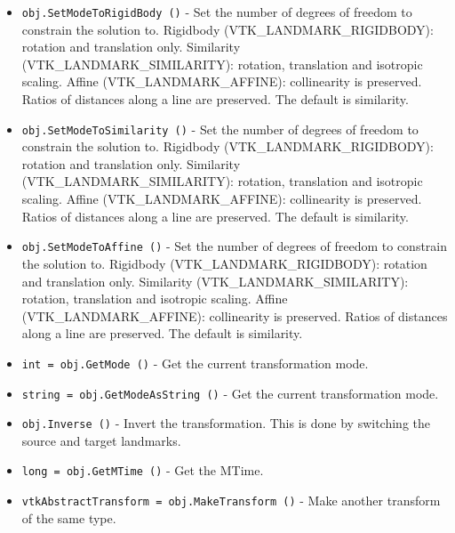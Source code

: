 \begin{itemize}
\item  \verb|obj.SetModeToRigidBody ()| -  Set the number of degrees of freedom to constrain the solution to.
 Rigidbody (VTK\_LANDMARK\_RIGIDBODY): rotation and translation only.  
 Similarity (VTK\_LANDMARK\_SIMILARITY): rotation, translation and 
            isotropic scaling.
 Affine (VTK\_LANDMARK\_AFFINE): collinearity is preserved. 
        Ratios of distances along a line are preserved.
 The default is similarity.

\item  \verb|obj.SetModeToSimilarity ()| -  Set the number of degrees of freedom to constrain the solution to.
 Rigidbody (VTK\_LANDMARK\_RIGIDBODY): rotation and translation only.  
 Similarity (VTK\_LANDMARK\_SIMILARITY): rotation, translation and 
            isotropic scaling.
 Affine (VTK\_LANDMARK\_AFFINE): collinearity is preserved. 
        Ratios of distances along a line are preserved.
 The default is similarity.

\item  \verb|obj.SetModeToAffine ()| -  Set the number of degrees of freedom to constrain the solution to.
 Rigidbody (VTK\_LANDMARK\_RIGIDBODY): rotation and translation only.  
 Similarity (VTK\_LANDMARK\_SIMILARITY): rotation, translation and 
            isotropic scaling.
 Affine (VTK\_LANDMARK\_AFFINE): collinearity is preserved. 
        Ratios of distances along a line are preserved.
 The default is similarity.

\item  \verb|int = obj.GetMode ()| -  Get the current transformation mode.

\item  \verb|string = obj.GetModeAsString ()| -  Get the current transformation mode.

\item  \verb|obj.Inverse ()| -  Invert the transformation.  This is done by switching the
 source and target landmarks.

\item  \verb|long = obj.GetMTime ()| -  Get the MTime.

\item  \verb|vtkAbstractTransform = obj.MakeTransform ()| -  Make another transform of the same type.

\end{itemize}
